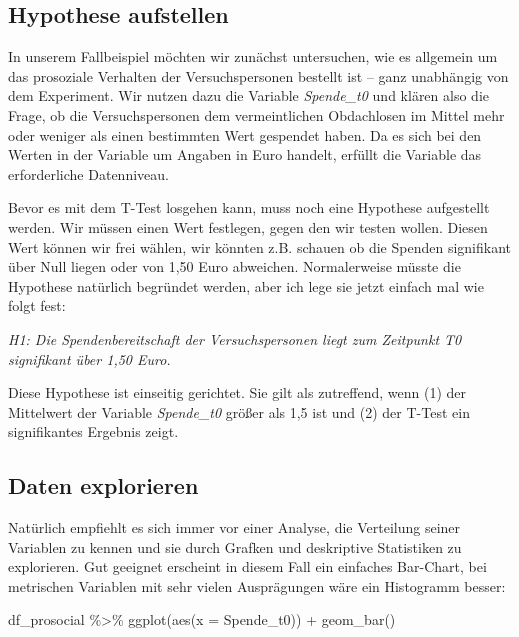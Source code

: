 \documentclass[
]{book}
\newenvironment{Shaded}{\begin{snugshade}}{\end{snugshade}}
\newcommand{\AttributeTok}[1]{\textcolor[rgb]{0.77,0.63,0.00}{#1}}
\newcommand{\FunctionTok}[1]{\textcolor[rgb]{0.00,0.00,0.00}{#1}}
\newcommand{\NormalTok}[1]{#1}
\newcommand{\SpecialCharTok}[1]{\textcolor[rgb]{0.00,0.00,0.00}{#1}}
\begin{document}
\hypertarget{hypothese-aufstellen}{%
\subsection{Hypothese aufstellen}\label{hypothese-aufstellen}}

In unserem Fallbeispiel möchten wir zunächst untersuchen, wie es allgemein um das prosoziale Verhalten der Versuchspersonen bestellt ist -- ganz unabhängig von dem Experiment. Wir nutzen dazu die Variable \emph{Spende\_t0} und klären also die Frage, ob die Versuchspersonen dem vermeintlichen Obdachlosen im Mittel mehr oder weniger als einen bestimmten Wert gespendet haben. Da es sich bei den Werten in der Variable um Angaben in Euro handelt, erfüllt die Variable das erforderliche Datenniveau.

Bevor es mit dem T-Test losgehen kann, muss noch eine Hypothese aufgestellt werden. Wir müssen einen Wert festlegen, gegen den wir testen wollen. Diesen Wert können wir frei wählen, wir könnten z.B. schauen ob die Spenden signifikant über Null liegen oder von 1,50 Euro abweichen. Normalerweise müsste die Hypothese natürlich begründet werden, aber ich lege sie jetzt einfach mal wie folgt fest:

\emph{H1: Die Spendenbereitschaft der Versuchspersonen liegt zum Zeitpunkt T0 signifikant über 1,50 Euro.}

Diese Hypothese ist einseitig gerichtet. Sie gilt als zutreffend, wenn (1) der Mittelwert der Variable \emph{Spende\_t0} größer als 1,5 ist und (2) der T-Test ein signifikantes Ergebnis zeigt.

\hypertarget{daten-explorieren}{%
\subsection{Daten explorieren}\label{daten-explorieren}}

Natürlich empfiehlt es sich immer vor einer Analyse, die Verteilung seiner Variablen zu kennen und sie durch Grafken und deskriptive Statistiken zu explorieren. Gut geeignet erscheint in diesem Fall ein einfaches Bar-Chart, bei metrischen Variablen mit sehr vielen Ausprägungen wäre ein Histogramm besser:

\begin{Shaded}
\begin{Highlighting}[]
\NormalTok{df\_prosocial }\SpecialCharTok{\%\textgreater{}\%} 
  \FunctionTok{ggplot}\NormalTok{(}\FunctionTok{aes}\NormalTok{(}\AttributeTok{x =}\NormalTok{ Spende\_t0)) }\SpecialCharTok{+}
  \FunctionTok{geom\_bar}\NormalTok{() }
\end{Highlighting}
\end{Shaded}
\end{document}
